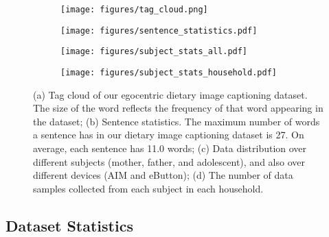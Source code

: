 \documentclass[journal]{IEEEtran}
\begin{document}
\begin{figure*}
\centering
\begin{subfigure}{.25\linewidth}
  \centering
  \texttt{[image: figures/tag\_cloud.png]}
  \caption{}
  \label{fig:tag_could}
\end{subfigure}%
\begin{subfigure}{.25\linewidth}
  \centering
  \texttt{[image: figures/sentence\_statistics.pdf]}
  \caption{}
  \label{fig:sentence_statistics}
\end{subfigure}%
\begin{subfigure}{.25\linewidth}
  \centering
  \texttt{[image: figures/subject\_stats\_all.pdf]}
  \caption{}
  \label{fig:subject_stats_all}
\end{subfigure}%
\begin{subfigure}{.25\linewidth}
  \centering
  \texttt{[image: figures/subject\_stats\_household.pdf]}
  \caption{}
  \label{fig:subject_stats_household}
\end{subfigure}

\caption{(a) Tag cloud of our egocentric dietary image captioning dataset. The size of the word reflects the frequency of that word appearing in the dataset; (b) Sentence statistics. The maximum number of words a sentence has in our dietary image captioning dataset is 27. On average, each sentence has 11.0 words; (c) Data distribution over different subjects (mother, father, and adolescent), and also over different devices (AIM and eButton); (d) The number of data samples collected from each subject in each household.}
\label{fig:data_statistics}

\end{figure*}











\subsection{Dataset Statistics}
\end{document}
